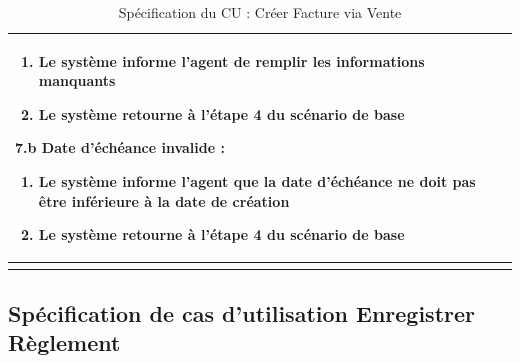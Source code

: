 \begin{longtable}{|>{\bfseries\raggedright\arraybackslash}p{3.5cm}|p{\dimexpr\textwidth-3.5cm-4\tabcolsep-2\arrayrulewidth}|}
\begin{enumerate}[leftmargin=1.5em, topsep=2pt, itemsep=1pt]
  \item Le système informe l'agent de remplir les informations manquants
  \item Le système retourne à l'étape 4 du scénario de base
\end{enumerate}
\textbf{7.b Date d'échéance invalide :}
\begin{enumerate}[leftmargin=1.5em, topsep=2pt, itemsep=1pt]
  \item Le système informe l'agent que la date d'échéance ne doit pas être inférieure à la date de création
  \item Le système retourne à l'étape 4 du scénario de base
\end{enumerate} \\
\hline
\caption{Spécification du CU : Créer Facture via Vente}
\label{tab:cu-creer-facture-vente}
\end{longtable}

\newpage
\subsection{Spécification de cas d'utilisation Enregistrer Règlement}

